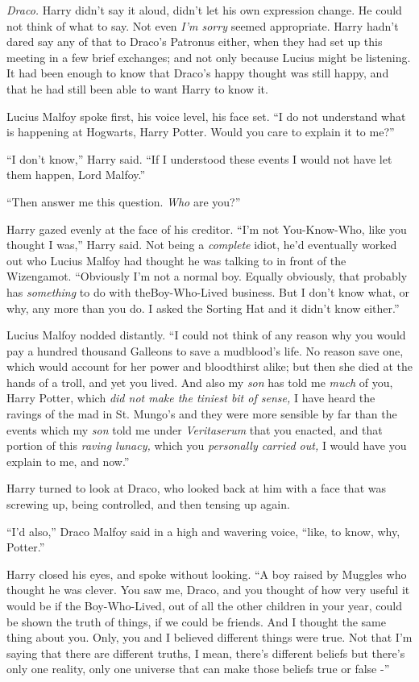 \emph{Draco.} Harry didn't say it aloud, didn't let his own expression change. He could not think of what to say. Not even \emph{I'm sorry} seemed appropriate. Harry hadn't dared say any of that to Draco's Patronus either, when they had set up this meeting in a few brief exchanges; and not only because Lucius might be listening. It had been enough to know that Draco's happy thought was still happy, and that he had still been able to want Harry to know it.

Lucius Malfoy spoke first, his voice level, his face set. ``I do not understand what is happening at Hogwarts, Harry Potter. Would you care to explain it to me?''

``I don't know,'' Harry said. ``If I understood these events I would not have let them happen, Lord Malfoy.''

``Then answer me this question. \emph{Who} are you?''

Harry gazed evenly at the face of his creditor. ``I'm not You-Know-Who, like you thought I was,'' Harry said. Not being a \emph{complete} idiot, he'd eventually worked out who Lucius Malfoy had thought he was talking to in front of the Wizengamot. ``Obviously I'm not a normal boy. Equally obviously, that probably has \emph{something} to do with theBoy-Who-Lived business. But I don't know what, or why, any more than you do. I asked the Sorting Hat and it didn't know either.''

Lucius Malfoy nodded distantly. ``I could not think of any reason why you would pay a hundred thousand Galleons to save a mudblood's life. No reason save one, which would account for her power and bloodthirst alike; but then she died at the hands of a troll, and yet you lived. And also my \emph{son} has told me \emph{much} of you, Harry Potter, which \emph{did not make the tiniest bit of sense,} I have heard the ravings of the mad in St. Mungo's and they were more sensible by far than the events which my \emph{son} told me under \emph{Veritaserum} that you enacted, and that portion of this \emph{raving lunacy,} which you
\emph{personally carried out,} I would have you explain to me, and now.''

Harry turned to look at Draco, who looked back at him with a face that was screwing up, being controlled, and then tensing up again.

``I'd also,'' Draco Malfoy said in a high and wavering voice, ``like, to know, why, Potter.''

Harry closed his eyes, and spoke without looking. ``A boy raised by Muggles who thought he was clever. You saw me, Draco, and you thought of how very useful it would be if the Boy-Who-Lived, out of all the other children in your year, could be shown the truth of things, if we could be friends. And I thought the same thing about you. Only, you and I believed different things were true. Not that I'm saying that there are different truths, I mean, there's different beliefs but there's only one reality, only one universe that can make those beliefs true or false -''


